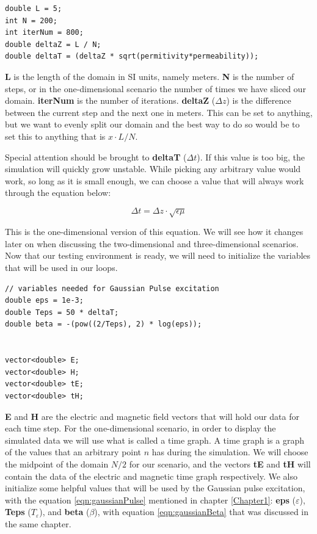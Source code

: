 \begin{verbatim}
double L = 5;
int N = 200;
int iterNum = 800;
double deltaZ = L / N;
double deltaT = (deltaZ * sqrt(permitivity*permeability));
\end{verbatim}

\textbf{L} is the length of the domain in SI units, namely meters. \textbf{N} is the number of steps, or in the one-dimensional scenario the number of times we have sliced our domain. \textbf{iterNum} is the number of iterations. \textbf{deltaZ} ($\Delta z$) is the difference between the current step and the next one in meters. This can be set to anything, but we want to evenly split our domain and the best way to do so would be to set this to anything that is $x \cdot L/N$.

Special attention should be brought to \textbf{deltaT} ($\Delta t$). If this value is too big, the simulation will quickly grow unstable. While picking any arbitrary value would work, so long as it is small enough, we can choose a value that will always work through the equation below:

\begin{equation}
	\label{eqn:deltaTcode}
	\Delta t = \Delta z \cdot \sqrt{\epsilon \mu}
\end{equation}

This is the one-dimensional version of this equation. We will see how it changes later on when discussing the two-dimensional and three-dimensional scenarios. Now that our testing environment is ready, we will need to initialize the variables that will be used in our loops.

\begin{verbatim}
// variables needed for Gaussian Pulse excitation
double eps = 1e-3;
double Teps = 50 * deltaT;
double beta = -(pow((2/Teps), 2) * log(eps));


vector<double> E;
vector<double> H;
vector<double> tE;
vector<double> tH;
\end{verbatim}

\textbf{E} and \textbf{H} are the electric and magnetic field vectors that will hold our data for each time step. For the one-dimensional scenario, in order to display the simulated data we will use what is called a time graph. A time graph is a graph of the values that an arbitrary point $n$ has during the simulation. We will choose the midpoint of the domain $N/2$ for our scenario, and the vectors \textbf{tE} and \textbf{tH} will contain the data of the electric and magnetic time graph respectively. We also initialize some helpful values that will be used by the Gaussian pulse excitation, with the equation \ref{eqn:gaussianPulse} mentioned in chapter \ref{Chapter1}: \textbf{eps} ($\varepsilon$), \textbf{Teps} ($T_\varepsilon$), and \textbf{beta} ($\beta$), with equation \ref{eqn:gaussianBeta} that was discussed in the same chapter.

